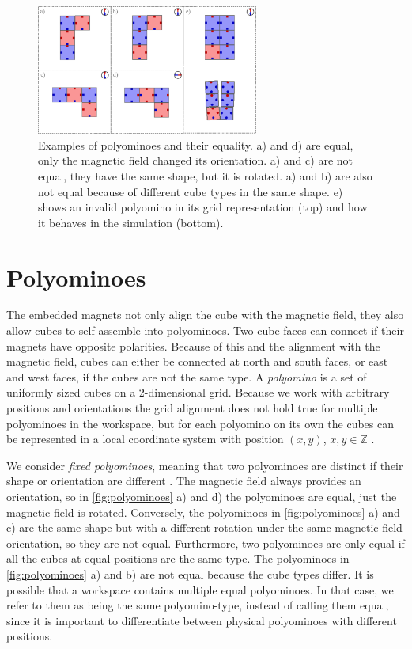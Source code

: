 \begin{figure}
	\centering
	\includegraphics[width=0.65\textwidth]{figures/polyominoes.pdf}
	\caption[Examples of Polyominoes and their equality]{Examples of polyominoes and their equality. a) and d) are equal, only the magnetic field changed its orientation. a) and c) are not equal, they have the same shape, but it is rotated. a) and b) are also not equal because of different cube types in the same shape. e) shows an invalid polyomino in its grid representation (top) and how it behaves in the simulation (bottom).}
	\label{fig:polyominoes}
\end{figure}

\section{Polyominoes}
\label{sec:polys}
The embedded magnets not only align the cube with the magnetic field, they also allow cubes to self-assemble into polyominoes.
Two cube faces can connect if their magnets have opposite polarities.
Because of this and the alignment with the magnetic field, cubes can either be connected at north and south faces, or east and west faces, if the cubes are not the same type.
A \textit{polyomino} is a set of uniformly sized cubes on a 2-dimensional grid.
Because we work with arbitrary positions and orientations the grid alignment does not hold true for multiple polyominoes in the workspace, but for each polyomino on its own the cubes can be represented in a local coordinate system with position $(x,y)$, $x,y \in \mathbb{Z}$ \cite{Lu2021}.

We consider \textit{fixed polyominoes}, meaning that two polyominoes are distinct if their shape or orientation are different \cite{Lu2021}.
The magnetic field always provides an orientation, so in \autoref{fig:polyominoes} a) and d) the polyominoes are equal, just the magnetic field is rotated.
Conversely, the polyominoes in \autoref{fig:polyominoes} a) and c) are the same shape but with a different rotation under the same magnetic field orientation, so they are not equal.
Furthermore, two polyominoes are only equal if all the cubes at equal positions are the same type.
The polyominoes in \autoref{fig:polyominoes} a) and b) are not equal because the cube types differ.
It is possible that a workspace contains multiple equal polyominoes.
In that case, we refer to them as being the same polyomino-type, instead of calling them equal, since it is important to differentiate between physical polyominoes with different positions.

